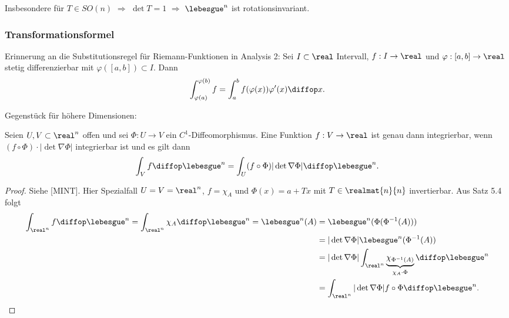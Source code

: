 Insbesondere für $T \in SO(n)$ $\Rightarrow$ $\det T = 1$ $\Rightarrow$ $\lebesgue^n$ ist rotationsinvariant.

\clearpage

\subsubsection{Transformationsformel}
Erinnerung an die Substitutionsregel für Riemann-Funktionen in Analysis 2: Sei $I \subset \real$ Intervall, $f:I \to \real$ und $\varphi:[a,b] \to \real$ stetig differenzierbar mit $\varphi([a,b]) \subset I$. Dann
\[ \int_{\varphi(a)}^{\varphi(b)} f = \int_a^b f(\varphi(x)) \varphi'(x) \diffop x. \]

Gegenstück für höhere Dimensionen:
\begin{thm}
 Seien $U,V \subset \real^n$ offen und sei $\Phi: U \to V$ ein $C^1$-Diffeomorphismus\footnotemark. Eine Funktion $f: V \to \real$ ist genau dann integrierbar, wenn $(f \circ \Phi) \cdot | \det \nabla \Phi |$ integrierbar ist und es gilt dann
 \[ \int_V f \diffop \lebesgue^n = \int_U (f \circ \Phi) | \det \nabla \Phi | \diffop \lebesgue^n. \]
\end{thm}

\begin{proof}
 Siehe [MINT]. Hier Spezialfall $U=V=\real^n$, $f = \chi_A$ und $\Phi(x) = a + Tx$ mit $T \in \realmat{n}{n}$ invertierbar. Aus Satz 5.4 folgt
 \begin{align*}
    \int_{\real^n} f \diffop \lebesgue^n = \int_{\real^n} \chi_A \diffop \lebesgue^n = \lebesgue^n(A)
    &= \lebesgue^n ( \Phi( \Phi^{-1}( A ) )) \\
    &= | \det \nabla \Phi | \lebesgue^n( \Phi^{-1}(A) ) \\
    &= | \det \nabla \Phi | \int_{\real^n} \underbrace{\chi_{\Phi^{-1}(A)}}_{\chi_A \cdot \Phi} \diffop \lebesgue^n \\
    &= \int_{\real^n} | \det\nabla \Phi | f \circ \Phi \diffop \lebesgue^n. \qedhere
 \end{align*}
\end{proof}

